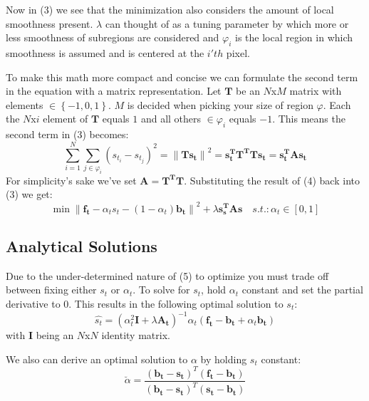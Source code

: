 \documentclass[12pt]{article}
\begin{document}
Now in (3) we see that the minimization also considers the amount of local smoothness present. $\lambda$ can thought of as a tuning parameter by which more or less smoothness of subregions are considered and $\varphi_{i}$ is the local region in which smoothness is assumed and is centered at the $i'th$ pixel.

To make this math more compact and concise we can formulate the second term in the equation with a matrix representation. Let $\boldsymbol{T}$ be an $N$x$M$ matrix with elements $\in \left\{-1,0,1\right\}$. $M$ is decided when picking your size of region $\varphi$. Each the $N$x$i$ element of $\boldsymbol{T}$ equals $1$ and all others $\in \varphi_{i} $ equals $-1$. This means the second term in (3) becomes: 
\begin{equation}
\sum_{i = 1}^{N} \sum_{j\in\varphi_{i}}(s_{t_i}-s_{t_j})^2 = \left \| \boldsymbol{Ts_t} \right \|^2 = \boldsymbol{s^T_tT^TTs_t}=\boldsymbol{s^T_tAs_t} 
\end{equation}
For simplicity's sake we've set $\boldsymbol{A} = \boldsymbol{T^TT}$. Substituting the result of (4) back into (3) we get:
\begin{equation}
\min\left \|   \boldsymbol{f_{t}} - \alpha_{t} s_{t} - (1-\alpha_{t} )\boldsymbol{\mathbf{b}_{t}}\right \|^2 +\lambda\boldsymbol{s^T_sAs} 
\quad
 s.t. :   \alpha_{t} \in \left [ 0 ,1 \right ]
\end{equation}



\subsection{Analytical Solutions}
Due to the under-determined nature of (5) to optimize you must trade off between fixing either ${s_{t}}$ or $\alpha_t$. To solve for ${s_{t}}$, hold $\alpha_t$ constant and set the partial derivative to 0. This results in the following optimal solution to ${s_{t}}$: 
\begin{equation}
\hat{s_t} = (\alpha_t^2\boldsymbol{I} + \lambda\boldsymbol{A_t})^{-1} \alpha_t(\boldsymbol{f_t}-\boldsymbol{b_t} +\alpha_t\boldsymbol{b_t})
\end{equation}
with $\boldsymbol{I}$ being an $N$x$N$ identity matrix. 

We also can derive an optimal solution to $\alpha$ by holding ${s_t}$ constant: 
\begin{equation}
\breve{\alpha }= \frac{(\boldsymbol{b_t-s_t})^T(\boldsymbol{f_t-b_t})}{(\boldsymbol{b_t-s_t})^T(\boldsymbol{s_t-b_t})}
\end{equation}
\end{document}
